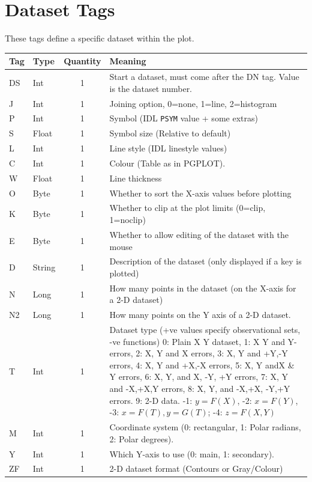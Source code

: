 \documentclass[english]{article}
\begin{document}
\section{Dataset Tags}

These tags define a specific dataset within the plot.

\begin{longtable}{|llcp{8cm}|}
  \hline Tag& Type& Quantity&
  Meaning\\
  \hline
  \endhead
  \hline
  \endfoot
  DS& Int& 1& Start a dataset, must come after the DN tag. Value is the
  dataset
  number.\\
  J& Int& 1&
  Joining option, 0=none, 1=line, 2=histogram\\
  P& Int& 1&
  Symbol (IDL \texttt{PSYM} value + some extras)\\
  S& Float& 1&
  Symbol size (Relative to default)\\
  L& Int& 1&
  Line style (IDL linestyle values)\\
  C& Int& 1&
  Colour (Table as in PGPLOT).\\
  W& Float& 1&
  Line thickness\\
  O& Byte& 1&
  Whether to sort the X-axis values before plotting\\
  K& Byte& 1&
  Whether to clip at the plot limits (0=clip, 1=noclip)\\
  E& Byte& 1&
  Whether to allow editing of the dataset with the mouse\\
  D& String& 1&
  Description of the dataset (only displayed if a key is plotted)\\
  N& Long& 1&
  How many points in the dataset (on the X-axis for a 2-D dataset)\\
  N2& Long& 1&
  How many points on the Y axis of a 2-D dataset.\\
  T& Int& 1& Dataset type (+ve values specify observational sets, -ve
  functions) 0: Plain X Y dataset, 1: X Y and Y-errors, 2: X, Y and X
  errors, 3: X, Y and +Y,-Y errors, 4: X, Y and +X,-X errors, 5: X, Y
  andX \& Y errors, 6: X, Y, and X, -Y, +Y errors, 7: X, Y and -X,+X,Y
  errors, 8: X, Y, and -X,+X, -Y,+Y errors. 9: 2-D data. -1: $y=F(X)$, -2:
  $x=F(Y)$, -3: $x=F(T),
  y=G(T)$; -4: $z=F(X,Y)$\\
  M& Int& 1&
  Coordinate system (0: rectangular, 1: Polar radians, 2: Polar
  degrees).\\
  Y & Int & 1 & Which Y-axis to use (0: main, 1: secondary).\\
  ZF& Int& 1&
  2-D dataset format (Contours or Gray/Colour)\\

\end{longtable}
\end{document}
